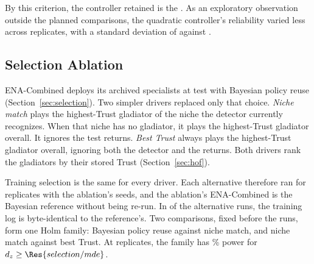 By this criterion, the controller retained is the . As an exploratory observation outside the planned comparisons, the quadratic controller's reliability varied less across replicates, with a standard deviation of  against .



\subsection{Selection Ablation}
\label{sec:selection_ablation}
ENA-Combined deploys its archived specialists at test with Bayesian policy reuse (Section~\ref{sec:selection}). Two simpler drivers replaced only that choice. \textit{Niche match} plays the highest-Trust gladiator of the niche the detector currently recognizes. When that niche has no gladiator, it plays the highest-Trust gladiator overall. It ignores the test returns. \textit{Best Trust} always plays the highest-Trust gladiator overall, ignoring both the detector and the returns. Both drivers rank the gladiators by their stored Trust (Section~\ref{sec:hof}).

Training selection is the same for every driver. Each alternative therefore ran for  replicates with the ablation's seeds, and the ablation's ENA-Combined is the Bayesian reference without being re-run. In  of the  alternative runs, the training log is byte-identical to the reference's. Two comparisons, fixed before the runs, form one Holm family: Bayesian policy reuse against niche match, and niche match against best Trust. At  replicates, the family has \% power for $d_z \ge \Res{selection/mde}$.

